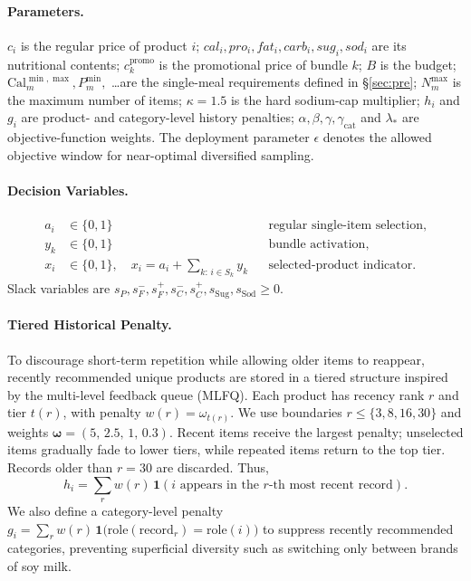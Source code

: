 \documentclass[a4paper]{article}
\begin{document}
\paragraph{Parameters.}$c_i$ is the regular price of product $i$; $cal_i,pro_i,fat_i,carb_i,sug_i,sod_i$ are its nutritional contents; $c_k^{\text{promo}}$ is the promotional price of bundle $k$; $B$ is the budget; $\text{Cal}^{\min,\max}_m, P^{\min}_m,$ \dots are the single-meal requirements defined in \S\ref{sec:pre}; $N^{\max}_m$ is the maximum number of items; $\kappa=1.5$ is the hard sodium-cap multiplier; $h_i$ and $g_i$ are product- and category-level history penalties; $\alpha,\beta,\gamma,\gamma_{\text{cat}}$ and $\lambda_*$ are objective-function weights. The deployment parameter $\epsilon$ denotes the allowed objective window for near-optimal diversified sampling.

\paragraph{Decision Variables.}\leavevmode
\[
\begin{aligned}
a_i &\in \{0,1\} &&\text{regular single-item selection},\\
y_k &\in \{0,1\} &&\text{bundle activation},\\
x_i &\in \{0,1\},\quad x_i = a_i + \sum_{k:\,i\in S_k} y_k &&\text{selected-product indicator}.
\end{aligned}
\]
Slack variables are $s_P, s^-_{F}, s^+_{F}, s^-_{C}, s^+_{C}, s_{\text{Sug}}, s_{\text{Sod}} \ge 0$.

\paragraph{Tiered Historical Penalty.}To discourage short-term repetition while allowing older items to reappear, recently recommended unique products are stored in a tiered structure inspired by the multi-level feedback queue (MLFQ). Each product has recency rank $r$ and tier $t(r)$, with penalty $w(r)=\omega_{t(r)}$. We use boundaries $r\le\{3,8,16,30\}$ and weights $\boldsymbol{\omega}=(5,\,2.5,\,1,\,0.3)$. Recent items receive the largest penalty; unselected items gradually fade to lower tiers, while repeated items return to the top tier. Records older than $r=30$ are discarded. Thus,
\[ h_i = \sum_{r} w(r)\,\mathbf{1}(i\text{ appears in the }r\text{-th most recent record}). \]
We also define a category-level penalty $g_i = \sum_{r} w(r)\,\mathbf{1}\!\big(\mathrm{role}(\text{record}_r)=\mathrm{role}(i)\big)$ to suppress recently recommended categories, preventing superficial diversity such as switching only between brands of soy milk.
\end{document}
